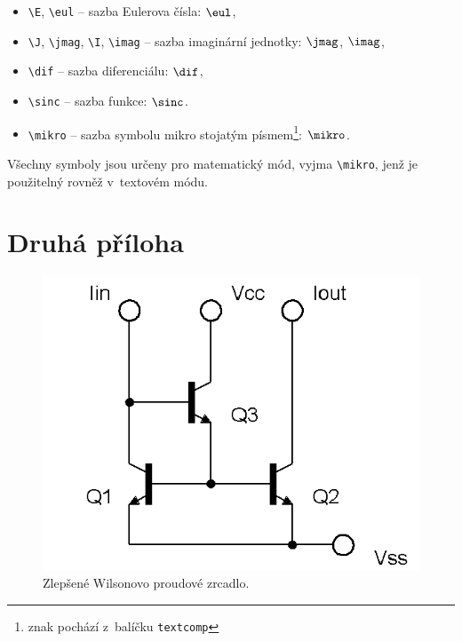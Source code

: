 \begin{itemize}
  \item
    \verb|\E|, \verb|\eul| -- sazba Eulerova čísla: $\eul$,
  \item
    \verb|\J|, \verb|\jmag|, \verb|\I|, \verb|\imag| -- sazba imaginární jednotky: $\jmag$, $\imag$,
  \item
    \verb|\dif| -- sazba diferenciálu: $\dif$,
  \item
    \verb|\sinc| -- sazba funkce: $\sinc$.
  \item
    \verb|\mikro| -- sazba symbolu mikro stojatým písmem\footnote{znak pochází z~balíčku \texttt{textcomp}}: $\mikro$.

\end{itemize}
%
Všechny symboly jsou určeny pro matematický mód, vyjma \verb|\mikro|, jenž je použitelný rovněž v~textovém módu.






\chapter{Druhá příloha}

\begin{figure}[!h]
  \begin{center}
    \includegraphics[scale=0.5]{obrazky/ZlepseneWilsonovoZrcadloNPN}
  \end{center}
  \caption{Zlepšené Wilsonovo proudové zrcadlo.}
\end{figure}